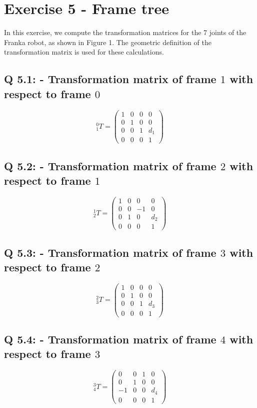 \section{Exercise 5 - Frame tree} \label{P5}
In this exercise, we compute the transformation matrices for the 7 joints of the Franka robot, as shown in Figure 1. The geometric definition of the transformation matrix is used for these calculations. 
\subsection{Q 5.1: - Transformation matrix of frame \( 1 \) with respect to frame \( 0 \)}
\[
^{0}_{1}T = \begin{pmatrix}
        1 & 0 & 0 & 0 \\
        0 & 1 & 0 & 0 \\
        0 & 0 & 1 & d_1 \\
        0 & 0 & 0 & 1
    \end{pmatrix}
\]

\subsection{Q 5.2: - Transformation matrix of frame \( 2 \) with respect to frame \( 1 \)}
\[
^{1}_{2}T = \begin{pmatrix}
        1 & 0 & 0 & 0 \\
        0 & 0 & -1 & 0 \\
        0 & 1 & 0 & d_2 \\
        0 & 0 & 0 & 1
    \end{pmatrix}
\]

\subsection{Q 5.3: - Transformation matrix of frame \( 3 \) with respect to frame \( 2 \)}
\[
^{2}_{3}T = \begin{pmatrix}
        1 & 0 & 0 & 0 \\
        0 & 1 & 0 & 0 \\
        0 & 0 & 1 & d_3 \\
        0 & 0 & 0 & 1
    \end{pmatrix}
\]

\subsection{Q 5.4: - Transformation matrix of frame \( 4 \) with respect to frame \( 3 \)}
\[
^{3}_{4}T = \begin{pmatrix}
        0 & 0 & 1 & 0 \\
        0 & 1 & 0 & 0 \\
        -1 & 0 & 0 & d_4 \\
        0 & 0 & 0 & 1
    \end{pmatrix}
\]

